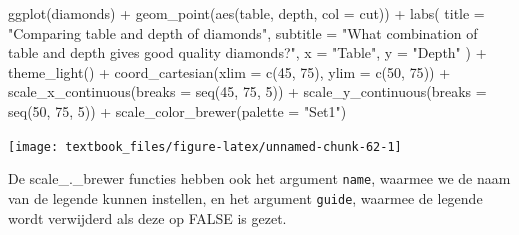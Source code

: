 \documentclass[]{tufte-book}
\newenvironment{Shaded}{}{}
\newcommand{\AttributeTok}[1]{\textcolor[rgb]{0.49,0.56,0.16}{#1}}
\newcommand{\DecValTok}[1]{\textcolor[rgb]{0.25,0.63,0.44}{#1}}
\newcommand{\FunctionTok}[1]{\textcolor[rgb]{0.02,0.16,0.49}{#1}}
\newcommand{\NormalTok}[1]{#1}
\newcommand{\SpecialCharTok}[1]{\textcolor[rgb]{0.25,0.44,0.63}{#1}}
\newcommand{\StringTok}[1]{\textcolor[rgb]{0.25,0.44,0.63}{#1}}
\begin{document}
\begin{Shaded}
\begin{Highlighting}[]
\FunctionTok{ggplot}\NormalTok{(diamonds) }\SpecialCharTok{+}
  \FunctionTok{geom\_point}\NormalTok{(}\FunctionTok{aes}\NormalTok{(table, depth, }\AttributeTok{col =}\NormalTok{ cut)) }\SpecialCharTok{+}
  \FunctionTok{labs}\NormalTok{(}
    \AttributeTok{title =} \StringTok{"Comparing table and depth of diamonds"}\NormalTok{,}
    \AttributeTok{subtitle =} \StringTok{"What combination of table and depth gives good quality diamonds?"}\NormalTok{,}
    \AttributeTok{x =} \StringTok{"Table"}\NormalTok{,}
    \AttributeTok{y =} \StringTok{"Depth"}
\NormalTok{  ) }\SpecialCharTok{+}
  \FunctionTok{theme\_light}\NormalTok{() }\SpecialCharTok{+}
  \FunctionTok{coord\_cartesian}\NormalTok{(}\AttributeTok{xlim =} \FunctionTok{c}\NormalTok{(}\DecValTok{45}\NormalTok{, }\DecValTok{75}\NormalTok{), }\AttributeTok{ylim =} \FunctionTok{c}\NormalTok{(}\DecValTok{50}\NormalTok{, }\DecValTok{75}\NormalTok{)) }\SpecialCharTok{+}
  \FunctionTok{scale\_x\_continuous}\NormalTok{(}\AttributeTok{breaks =} \FunctionTok{seq}\NormalTok{(}\DecValTok{45}\NormalTok{, }\DecValTok{75}\NormalTok{, }\DecValTok{5}\NormalTok{)) }\SpecialCharTok{+}
  \FunctionTok{scale\_y\_continuous}\NormalTok{(}\AttributeTok{breaks =} \FunctionTok{seq}\NormalTok{(}\DecValTok{50}\NormalTok{, }\DecValTok{75}\NormalTok{, }\DecValTok{5}\NormalTok{)) }\SpecialCharTok{+}
  \FunctionTok{scale\_color\_brewer}\NormalTok{(}\AttributeTok{palette =} \StringTok{"Set1"}\NormalTok{)}
\end{Highlighting}
\end{Shaded}

\texttt{[image: textbook\_files/figure-latex/unnamed-chunk-62-1]}

De scale\_.\_brewer functies hebben ook het argument \texttt{name}, waarmee we de naam van de legende kunnen instellen, en het argument \texttt{guide}, waarmee de legende wordt verwijderd als deze op FALSE is gezet.
\end{document}
